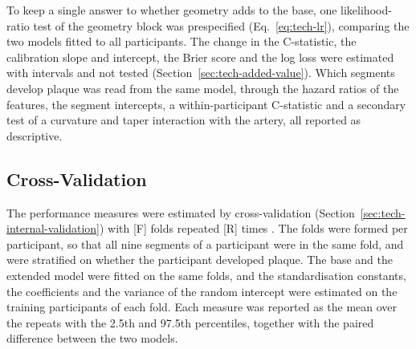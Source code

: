 To keep a single answer to whether geometry adds to the base, one likelihood-ratio test of the geometry block was prespecified (Eq.~\eqref{eq:tech-lr}), comparing the two models fitted to all participants.
The change in the C-statistic, the calibration slope and intercept, the Brier score and the log loss were estimated with intervals and not tested (Section~\ref{sec:tech-added-value}).
Which segments develop plaque was read from the same model, through the hazard ratios of the features, the segment intercepts, a within-participant C-statistic and a secondary test of a curvature and taper interaction with the artery, all reported as descriptive.

\subsection{Cross-Validation}
\label{sec:method-cv}

The performance measures were estimated by cross-validation (Section~\ref{sec:tech-internal-validation}) with [F] folds repeated [R] times .
The folds were formed per participant, so that all nine segments of a participant were in the same fold, and were stratified on whether the participant developed plaque.
The base and the extended model were fitted on the same folds, and the standardisation constants, the coefficients and the variance of the random intercept were estimated on the training participants of each fold.
Each measure was reported as the mean over the repeats with the 2.5th and 97.5th percentiles, together with the paired difference between the two models.

